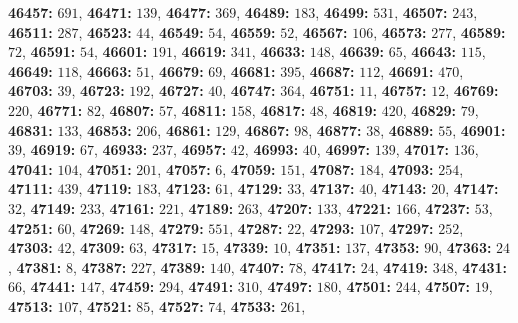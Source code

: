 \textsf{\bfseries 46457:} $691$, \textsf{\bfseries 46471:} $139$, \textsf{\bfseries 46477:} $369$, \textsf{\bfseries 46489:} $183$, \textsf{\bfseries 46499:} $531$, \textsf{\bfseries 46507:} $243$, \textsf{\bfseries 46511:} $287$, \textsf{\bfseries 46523:} $44$, \textsf{\bfseries 46549:} $54$, \textsf{\bfseries 46559:} $52$, \textsf{\bfseries 46567:} $106$, \textsf{\bfseries 46573:} $277$, \textsf{\bfseries 46589:} $72$, \textsf{\bfseries 46591:} $54$, \textsf{\bfseries 46601:} $191$, \textsf{\bfseries 46619:} $341$, \textsf{\bfseries 46633:} $148$, \textsf{\bfseries 46639:} $65$, \textsf{\bfseries 46643:} $115$, \textsf{\bfseries 46649:} $118$, \textsf{\bfseries 46663:} $51$, \textsf{\bfseries 46679:} $69$, \textsf{\bfseries 46681:} $395$, \textsf{\bfseries 46687:} $112$, \textsf{\bfseries 46691:} $470$, \textsf{\bfseries 46703:} $39$, \textsf{\bfseries 46723:} $192$, \textsf{\bfseries 46727:} $40$, \textsf{\bfseries 46747:} $364$, \textsf{\bfseries 46751:} $11$, \textsf{\bfseries 46757:} $12$, \textsf{\bfseries 46769:} $220$, \textsf{\bfseries 46771:} $82$, \textsf{\bfseries 46807:} $57$, \textsf{\bfseries 46811:} $158$, \textsf{\bfseries 46817:} $48$, \textsf{\bfseries 46819:} $420$, \textsf{\bfseries 46829:} $79$, \textsf{\bfseries 46831:} $133$, \textsf{\bfseries 46853:} $206$, \textsf{\bfseries 46861:} $129$, \textsf{\bfseries 46867:} $98$, \textsf{\bfseries 46877:} $38$, \textsf{\bfseries 46889:} $55$, \textsf{\bfseries 46901:} $39$, \textsf{\bfseries 46919:} $67$, \textsf{\bfseries 46933:} $237$, \textsf{\bfseries 46957:} $42$, \textsf{\bfseries 46993:} $40$, \textsf{\bfseries 46997:} $139$, \textsf{\bfseries 47017:} $136$, \textsf{\bfseries 47041:} $104$, \textsf{\bfseries 47051:} $201$, \textsf{\bfseries 47057:} $6$, \textsf{\bfseries 47059:} $151$, \textsf{\bfseries 47087:} $184$, \textsf{\bfseries 47093:} $254$, \textsf{\bfseries 47111:} $439$, \textsf{\bfseries 47119:} $183$, \textsf{\bfseries 47123:} $61$, \textsf{\bfseries 47129:} $33$, \textsf{\bfseries 47137:} $40$, \textsf{\bfseries 47143:} $20$, \textsf{\bfseries 47147:} $32$, \textsf{\bfseries 47149:} $233$, \textsf{\bfseries 47161:} $221$, \textsf{\bfseries 47189:} $263$, \textsf{\bfseries 47207:} $133$, \textsf{\bfseries 47221:} $166$, \textsf{\bfseries 47237:} $53$, \textsf{\bfseries 47251:} $60$, \textsf{\bfseries 47269:} $148$, \textsf{\bfseries 47279:} $551$, \textsf{\bfseries 47287:} $22$, \textsf{\bfseries 47293:} $107$, \textsf{\bfseries 47297:} $252$, \textsf{\bfseries 47303:} $42$, \textsf{\bfseries 47309:} $63$, \textsf{\bfseries 47317:} $15$, \textsf{\bfseries 47339:} $10$, \textsf{\bfseries 47351:} $137$, \textsf{\bfseries 47353:} $90$, \textsf{\bfseries 47363:} $24$, \textsf{\bfseries 47381:} $8$, \textsf{\bfseries 47387:} $227$, \textsf{\bfseries 47389:} $140$, \textsf{\bfseries 47407:} $78$, \textsf{\bfseries 47417:} $24$, \textsf{\bfseries 47419:} $348$, \textsf{\bfseries 47431:} $66$, \textsf{\bfseries 47441:} $147$, \textsf{\bfseries 47459:} $294$, \textsf{\bfseries 47491:} $310$, \textsf{\bfseries 47497:} $180$, \textsf{\bfseries 47501:} $244$, \textsf{\bfseries 47507:} $19$, \textsf{\bfseries 47513:} $107$, \textsf{\bfseries 47521:} $85$, \textsf{\bfseries 47527:} $74$, \textsf{\bfseries 47533:} $261$, 
